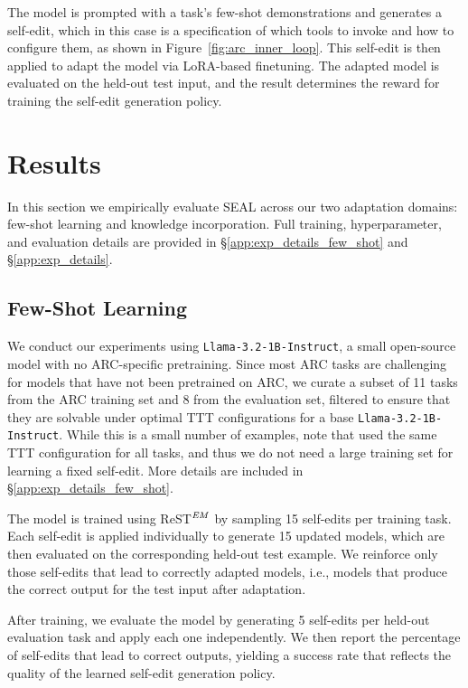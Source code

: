 \documentclass{article}
\newcommand{\methodacronym}{SEAL\xspace}
\begin{document}
The model is prompted with a task's few-shot demonstrations and generates a self-edit, which in this case is a specification of which tools to invoke and how to configure them, as shown in Figure~\ref{fig:arc_inner_loop}. This self-edit is then applied to adapt the model via LoRA-based finetuning. The adapted model is evaluated on the held-out test input, and the result determines the reward for training the self-edit generation policy.

\section{Results}

In this section we empirically evaluate \methodacronym{} across our two adaptation domains: few-shot learning and knowledge incorporation. Full training, hyperparameter, and evaluation details are provided in \S\ref{app:exp_details_few_shot} and \S\ref{app:exp_details}.

\subsection{Few-Shot Learning}

We conduct our experiments using \texttt{Llama-3.2-1B-Instruct}, a small open-source model with no ARC-specific pretraining. Since most ARC tasks are challenging for models that have not been pretrained on ARC, we curate a subset of 11 tasks from the ARC training set and 8 from the evaluation set, filtered to ensure that they are solvable under optimal TTT configurations for a base \texttt{Llama-3.2-1B-Instruct}. While this is a small number of examples, note that \citet{akyurek2025TTT} used the same TTT configuration for all tasks, and thus we do not need a large training set for learning a fixed self-edit. More details are included in \S\ref{app:exp_details_few_shot}.

The model is trained using ReST$^\text{\textit{EM}}$ by sampling 15 self-edits per training task. Each self-edit is applied individually to generate 15 updated models, which are then evaluated on the corresponding held-out test example. We reinforce only those self-edits that lead to correctly adapted models, i.e., models that produce the correct output for the test input after adaptation.

After training, we evaluate the model by generating 5 self-edits per held-out evaluation task and apply each one independently. We then report the percentage of self-edits that lead to correct outputs, yielding a success rate that reflects the quality of the learned self-edit generation policy.
\end{document}
